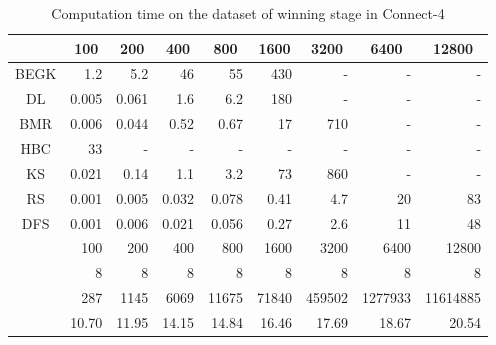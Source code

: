 \begin{table}
\caption{Computation time on the dataset of winning stage in Connect-4}
\label{winning}
\begin{center}
\begin{tabular}[c]{| r | r | r | r | r | r | r | r | r |}
\hline
\multicolumn{1}{|c||}{} & \multicolumn{1}{|c|}{100} & \multicolumn{1}{|c|}{200}& \multicolumn{1}{|c|}{400} & \multicolumn{1}{|c|}{800} & \multicolumn{1}{|c|}{1600} &
\multicolumn{1}{|c|}{3200} & \multicolumn{1}{|c|}{6400} & \multicolumn{1}{|c|}{12800} \\
\hline
\multicolumn{1}{|c||}{BEGK} &1.2&5.2&46&55&430&-&-&- \\\hline
\multicolumn{1}{|c||}{DL} &0.005&0.061&1.6&6.2&180&-&-&- \\\hline
\multicolumn{1}{|c||}{BMR} &0.006&0.044&0.52&0.67&17&710&-&- \\\hline
\multicolumn{1}{|c||}{HBC} &33&-&-&-&-&-&-&- \\\hline
\multicolumn{1}{|c||}{KS} &0.021&0.14&1.1&3.2&73&860&-&- \\\hline
\multicolumn{1}{|c||}{RS} &0.001 & 0.005 & 0.032 & 0.078 & 0.41 & 4.7 & 20 & 83\\\hline
\multicolumn{1}{|c||}{DFS} &0.001 & 0.006 & 0.021 & 0.056 & 0.27 & 2.6 & 11 & 48\\\hline
\hline
\multicolumn{1}{|c||}{}& 100 & 200 & 400 & 800 & 1600 & 3200 & 6400 &12800\\
\hline
\multicolumn{1}{|c||}{}& 8 & 8 & 8 & 8 & 8 & 8 & 8 &8\\
\hline
\multicolumn{1}{|c||}{}&287&1145&6069&11675&71840& 459502 & 1277933 & 11614885\\
\hline
\multicolumn{1}{|c||}{}&10.70&11.95&14.15&14.84&16.46& 17.69 & 18.67 & 20.54\\
\hline
\end{tabular}
\end{center}
\end{table}

